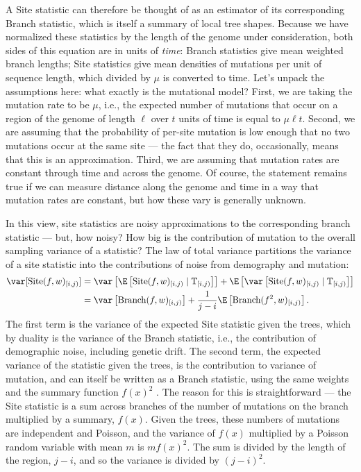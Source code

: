\documentclass{article}
\newcommand{\branch}{\mbox{Branch}} %
\newcommand{\site}{\mbox{Site}} %
\newcommand{\given}{\;\vert\;}
\newcommand{\treeseq}{\mathbb{T}} %
\newcommand{\iw}{w} %
\begin{document}
A Site statistic can therefore be thought of as an estimator of its corresponding Branch statistic,
which is itself a summary of local tree shapes.
Because we have normalized these statistics by the length of the genome under consideration,
both sides of this equation are in units of \emph{time}:
Branch statistics give mean weighted branch lengths;
Site statistics give mean densities of mutations per unit of sequence length,
which divided by $\mu$ is converted to time.
Let's unpack the assumptions here: what exactly is the mutational model?
First, we are taking the mutation rate to be $\mu$, i.e.,
the expected number of mutations that occur on a region of the genome of length $\ell$
over $t$ units of time is equal to $\mu \ell t$.
Second, we are assuming that the probability of per-site mutation is low enough
that no two mutations occur at the same site
--- the fact that they do, occasionally, means that this is an approximation.
Third, we are assuming that mutation rates are constant through time and across the genome.
Of course, the statement remains true if we can measure distance along the genome and time
in a way that mutation rates are constant, but how these vary is generally unknown.

In this view,
site statistics are noisy approximations to the corresponding branch statistic
--- but, how noisy?
How big is the contribution of mutation to the overall sampling variance of a statistic?
The law of total variance partitions the variance of a site statistic
into the contributions of noise from demography and mutation:
\begin{align*}
    \var[\site(f, \iw)_{[i,j)}]
    &=
        \var\left[ \E\left[\site(f, \iw)_{[i,j)} \given \treeseq_{[i,j)}\right] \right] 
            +
        \E\left[ \var\left[\site(f, \iw)_{[i,j)} \given \treeseq_{[i,j)}\right] \right]
        \\
    &=
        \var\left[ \branch(f, \iw)_{[i,j)} \right]
            +
        \frac{1}{j-i} \E\left[ \branch(f^2, \iw)_{[i,j)} \right] .
\end{align*}
The first term is the variance of the expected Site statistic given the trees,
which by duality is the variance of the Branch statistic,
i.e., the contribution of demographic noise, including genetic drift.
The second term, the expected variance of the statistic given the trees,
is the contribution to variance of mutation,
and can itself be written as a Branch statistic,
using the same weights and the summary function $f(x)^2$
\citep[Lemma 2 in][]{ralph2019empirical}.
The reason for this is straightforward ---
the Site statistic is a sum across branches of the number of mutations on the branch
multiplied by a summary, $f(x)$.
Given the trees, these numbers of mutations are independent and Poisson,
and the variance of $f(x)$ multiplied by a Poisson random variable with mean $m$ is $m f(x)^2$.
The sum is divided by the length of the region, $j-i$,
and so the variance is divided by $(j-i)^2$.
\end{document}

